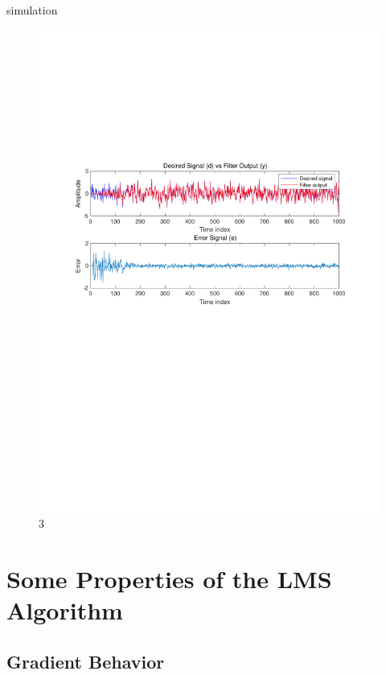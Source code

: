 \documentclass{beamer}
\begin{document}
\begin{frame}{simulation}
    \begin{figure}[htbp]
        \centering
        \vspace{-3.0cm}
        \includegraphics[scale=0.5]{pic/lms.pdf}
        \caption{3}
    \end{figure}
\end{frame}


\section{Some Properties of the LMS Algorithm}

\subsection{Gradient Behavior}
\end{document}

